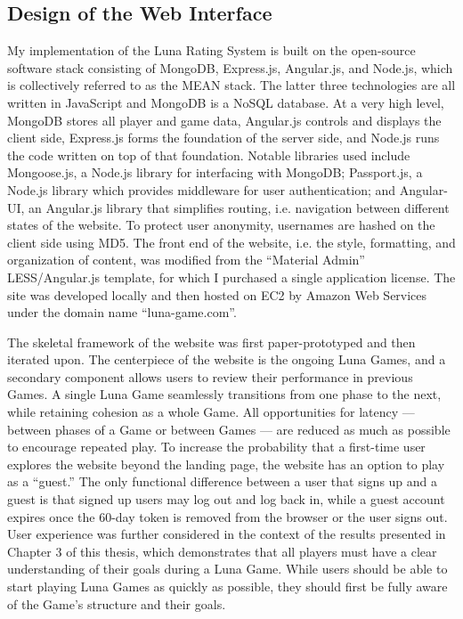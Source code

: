 \subsection{Design of the Web Interface}

My implementation of the Luna Rating System is built on the open-source software stack consisting of MongoDB, Express.js, Angular.js, and Node.js, which is collectively referred to as the MEAN stack\cite{meanstack}. The latter three technologies are all written in JavaScript and MongoDB is a NoSQL database. At a very high level, MongoDB stores all player and game data, Angular.js controls and displays the client side, Express.js forms the foundation of the server side, and Node.js runs the code written on top of that foundation. Notable libraries used include Mongoose.js, a Node.js library for interfacing with MongoDB; Passport.js, a Node.js library which provides middleware for user authentication; and Angular-UI, an Angular.js library that simplifies routing, i.e. navigation between different states of the website. To protect user anonymity, usernames are hashed on the client side using MD5. The front end of the website, i.e. the style, formatting, and organization of content, was modified from the ``Material Admin'' LESS/Angular.js template, for which I purchased a single application license\cite{materials}. The site was developed locally and then hosted on EC2 by Amazon Web Services under the domain name ``luna-game.com''.

The skeletal framework of the website was first paper-prototyped and then iterated upon\cite{paperproto}. The centerpiece of the website is the ongoing Luna Games, and a secondary component allows users to review their performance in previous Games. A single Luna Game seamlessly transitions from one phase to the next, while retaining cohesion as a whole Game. All opportunities for latency --- between phases of a Game or between Games ---  are reduced as much as possible to encourage repeated play. To increase the probability that a first-time user explores the website beyond the landing page, the website has an option to play as a ``guest.'' The only functional difference between a user that signs up and a guest is that signed up users may log out and log back in, while a guest account expires once the 60-day token is removed from the browser or the user signs out. User experience was further considered in the context of the results presented in Chapter 3 of this thesis, which demonstrates that all players must have a clear understanding of their goals during a Luna Game. While users should be able to start playing Luna Games as quickly as possible, they should first be fully aware of the Game's structure and their goals.

